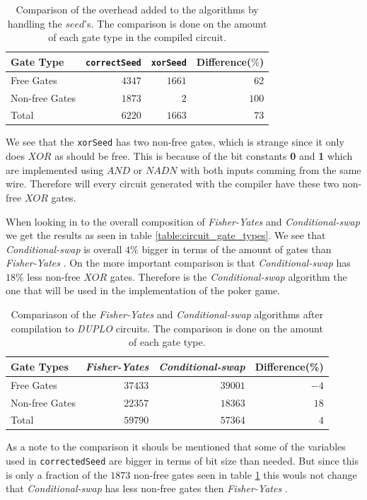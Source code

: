 \documentclass[twoside,11pt,openright]{report}
\newcommand{\FY}{\textit{Fisher-Yates} }
\newcommand{\CS}{\textit{Conditional-swap} }
\newcommand{\DUPLO}{\textit{DUPLO} }
\begin{document}
\begin{table}
\centering
\begin{tabular}{l || r r r}
Gate Type      & \verb|correctSeed| & \verb|xorSeed| & Difference($\%$)    \\
\hline
Free Gates     & $4347$             & $1661$         &  $62$ \\
Non-free Gates & $1873$             &    $2$         & $100$ \\
\hline
Total          & $6220$             & $1663$         &  $73$
\end{tabular}
\caption{Comparison of the overhead added to the algorithms by handling the $seed$'s. The comparison is done on the amount of each gate type in the compiled circuit.}
\label{table:alg_preprocess_overhead}
\end{table}

We see that the \verb|xorSeed| has two non-free gates, which is strange since it only does $XOR$ as should be free. This is because of the bit constants \textbf{0} and \textbf{1} which are implemented using $AND$ or $NADN$ with both inputs comming from the same wire. Therefore will every circuit generated with the compiler have these two non-free $XOR$ gates.

\bigskip

When looking in to the overall composition of \FY and \CS we get the results as seen in table \ref{table:circuit_gate_types}. We see that \CS is overall $4\%$ bigger in terms of the amount of gates than \FY. On the more important comparison is that \CS has $18\%$ less non-free $XOR$ gates. Therefore is the \CS algorithm the one that will be used in the implementation of the poker game.

\begin{table}
\centering
\begin{tabular}{l || r | r | r}
Gate Types     & \FY     & \CS     & Difference(\%) \\
\hline
Free Gates     & $37433$ & $39001$ & $-4$   \\
Non-free Gates & $22357$ & $18363$ & $18$   \\
\hline
Total          & $59790$ & $57364$ &  $4$
\end{tabular}
\caption{Compariason of the \FY and \CS algorithms after compilation to \DUPLO circuits. The comparison is done on the amount of each gate type.}
\label{table:circuit_comp}
\end{table}

As a note to the comparison it shouls be mentioned that some of the variables used in \verb|correctedSeed| are bigger in terms of bit size than needed. But since this is only a fraction of the $1873$ non-free gates seen in table \ref{table:alg_preprocess_overhead} this wouls not change that \CS has less non-free gates then \FY .
\end{document}
